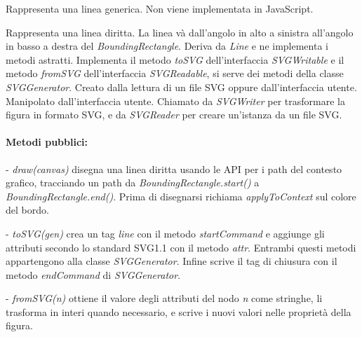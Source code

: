 Rappresenta una linea generica. Non viene implementata in JavaScript.

Rappresenta una linea diritta. La linea v\`a dall'angolo in alto a sinistra all'angolo in basso a destra del \textit{BoundingRectangle}.
Deriva da \textit{Line} e ne implementa i metodi astratti. Implementa il metodo \textit{toSVG} dell'interfaccia \textit{SVGWritable} e il metodo \textit{fromSVG} dell'interfaccia \textit{SVGReadable}, si serve dei metodi della classe \textit{SVGGenerator}.
Creato dalla lettura di un file SVG oppure dall'interfaccia utente. Manipolato dall'interfaccia utente. Chiamato da \textit{SVGWriter} per trasformare la figura in formato SVG, e da \textit{SVGReader} per creare un'istanza da un file SVG.
\paragraph{Metodi pubblici:}
\begin{elencopuntato}[\subsubsecindent]
\item[-] \textit{draw(canvas)} disegna una linea diritta usando le API per i path del contesto grafico, tracciando un path da \textit{BoundingRectangle.start()} a \textit{BoundingRectangle.end()}. Prima di disegnarsi richiama \textit{applyToContext} sul colore del bordo.
\item[-] \textit{toSVG(gen)} crea un tag \textit{line} con il metodo \textit{startCommand} e aggiunge gli attributi secondo lo standard SVG1.1 con il metodo \textit{attr}. Entrambi questi metodi appartengono alla classe \textit{SVGGenerator}. Infine scrive il tag di chiusura con il metodo \textit{endCommand} di \textit{SVGGenerator}.
\item[-] \textit{fromSVG(n)} ottiene il valore degli attributi del nodo \textit{n} come stringhe, li trasforma in interi quando necessario, e scrive i nuovi valori nelle propriet\`a della figura. 
\end{elencopuntato}

